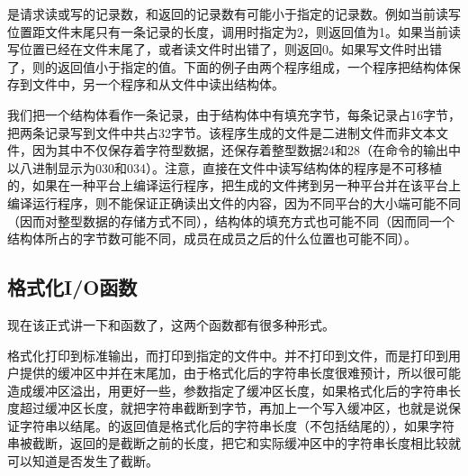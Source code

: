 是请求读或写的记录数，和返回的记录数有可能小于指定的记录数。例如当前读写位置距文件末尾只有一条记录的长度，调用时指定为2，则返回值为1。如果当前读写位置已经在文件末尾了，或者读文件时出错了，则返回0。如果写文件时出错了，则的返回值小于指定的值。下面的例子由两个程序组成，一个程序把结构体保存到文件中，另一个程序和从文件中读出结构体。







我们把一个结构体看作一条记录，由于结构体中有填充字节，每条记录占16字节，把两条记录写到文件中共占32字节。该程序生成的文件是二进制文件而非文本文件，因为其中不仅保存着字符型数据，还保存着整型数据24和28（在命令的输出中以八进制显示为030和034）。注意，直接在文件中读写结构体的程序是不可移植的，如果在一种平台上编译运行程序，把生成的文件拷到另一种平台并在该平台上编译运行程序，则不能保证正确读出文件的内容，因为不同平台的大小端可能不同（因而对整型数据的存储方式不同），结构体的填充方式也可能不同（因而同一个结构体所占的字节数可能不同，成员在成员之后的什么位置也可能不同）。


\subsection{格式化I/O函数}
%


现在该正式讲一下和函数了，这两个函数都有很多种形式。




格式化打印到标准输出，而打印到指定的文件中。并不打印到文件，而是打印到用户提供的缓冲区中并在末尾加，由于格式化后的字符串长度很难预计，所以很可能造成缓冲区溢出，用更好一些，参数指定了缓冲区长度，如果格式化后的字符串长度超过缓冲区长度，就把字符串截断到字节，再加上一个写入缓冲区，也就是说保证字符串以结尾。的返回值是格式化后的字符串长度（不包括结尾的），如果字符串被截断，返回的是截断之前的长度，把它和实际缓冲区中的字符串长度相比较就可以知道是否发生了截断。



